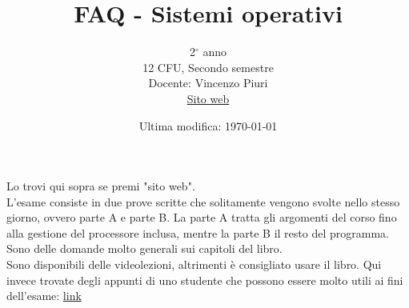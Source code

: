 \documentclass{article}
\title{FAQ - \textbf{Sistemi operativi}}
\date{Ultima modifica: \today}
\author{
	2$^{\circ}$ anno\\12 CFU, Secondo semestre\\
	Docente: Vincenzo Piuri\\ 
	\href{https://vpiuriso.ariel.ctu.unimi.it/v5/home/Default.aspx}{Sito web}
}
\begin{document}
 
	\maketitle
	
	\begin{enumerate}
		
		\rmfamily
		Lo trovi qui sopra se premi "sito web".\\
		
		L'esame consiste in due prove scritte che solitamente vengono svolte nello stesso giorno, ovvero parte A e parte B.
		La parte A tratta gli argomenti del corso fino alla gestione del processore inclusa, mentre la parte B il resto
		del programma. Sono delle domande molto generali sui capitoli del libro.\\
		
		
		Sono disponibili delle videolezioni, altrimenti è consigliato usare il libro.
		Qui invece trovate degli appunti di uno studente che possono essere molto utili ai fini dell'esame: \href{http://www.swappa.it/wiki/Uni/SistemiOperativi}{link}\\
		
	\end{enumerate}
	
\end{document}
